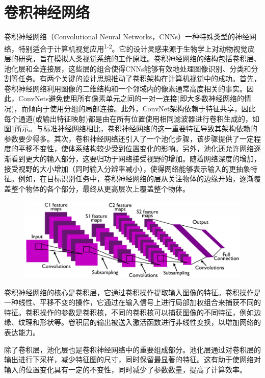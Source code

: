 \section{卷积神经网络}
卷积神经网络（Convolutional Neural Networks，CNNs）一种特殊类型的神经网络，特别适合于计算机视觉应用\textsuperscript{\cite{image}1-2}。它的设计灵感来源于生物学上对动物视觉皮层的研究，旨在模拟人类视觉系统的工作原理。卷积神经网络的结构包括卷积层、池化层和全连接层，这些层的组合使得CNNs能够有效地处理图像识别、分类和分割等任务。有两个关键的设计思想推动了卷积架构在计算机视觉中的成功。首先，卷积神经网络利用图像的二维结构和一个邻域内的像素通常高度相关的事实。因此，ConvNets避免使用所有像素单元之间的一对一连接(即大多数神经网络的情况)，而倾向于使用分组的局部连接。此外，ConvNet架构依赖于特征共享，因此每个通道(或输出特征映射)都是由在所有位置使用相同滤波器进行卷积生成的，如图\ref{fig:conv1}所示。与标准神经网络相比，卷积神经网络的这一重要特征导致其架构依赖的参数要少得多。其次，卷积神经网络还引入了一个池化步骤，该步骤提供了一定程度的平移不变性，使体系结构较少受到位置变化的影响。另外，池化还允许网络逐渐看到更大的输入部分，这要归功于网络接受视野的增加。随着网络深度的增加，接受视野的大小增加（同时输入分辨率减小），使得网络能够表示输入的更抽象特征。例如，在目标识别任务中，卷积神经网络的层从关注物体的边缘开始，逐渐覆盖整个物体的各个部分，最终从更高层次上覆盖整个物体。

\begin{figure}[h]
	\centering 
	\includegraphics[width=15cm]{fig/ch2/conv1.png}
	\label{fig:conv1}
\end{figure}

卷积神经网络的核心是卷积层，它通过卷积操作提取输入图像的特征。卷积操作是一种线性、平移不变的操作，它通过在输入信号上进行局部加权组合来捕获不同的特征。卷积操作的参数是卷积核，不同的卷积核可以捕获图像的不同特征，例如边缘、纹理和形状等。卷积层的输出被送入激活函数进行非线性变换，以增加网络的表达能力。

除了卷积层，池化层也是卷积神经网络中的重要组成部分。池化层通过对卷积层的输出进行下采样，减少特征图的尺寸，同时保留最显著的特征。这有助于使网络对输入的位置变化具有一定的不变性，同时减少了参数数量，提高了计算效率。

